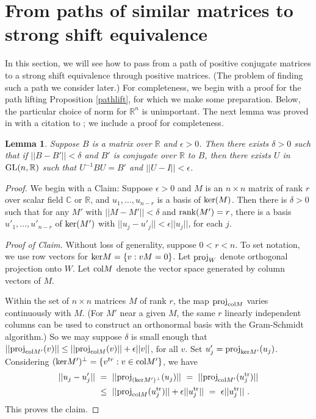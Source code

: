 \documentclass{amsart}
\newtheorem{lemma}[theorem]{Lemma}
\theoremstyle{definition}
\theoremstyle{remark}
\numberwithin{equation}{section}
\begin{document}
{{\section{From paths of similar matrices to strong shift equivalence}
\label{frompathssec}

In this section, we will see how to pass from a path of positive conjugate 
matrices to a strong shift equivalence through positive matrices.   
(The problem of finding such a path we consider later.) 
For completeness, we begin with  a proof for the path lifting 
Proposition \ref{pathlift}, for which we make some preparation. 
Below, the particular choice of norm for $\mathbb R^n$ is 
unimportant. The next lemma was proved in \cite{KR3} with a 
citation to \cite{GR}; we include a proof for completeness. 

\begin{lemma} 
\label{closeconjugation}
Suppose $B$ is a matrix over $\mathbb R$ 
and $\epsilon > 0$. 
Then there exists $\delta >0 $ such that 
if  $||B-B'||<\delta$ and 
$B'$ is conjugate over $\mathbb R$ to $B$, 
then there exists $U$ in $\textnormal{GL}(n,\mathbb R)$ such that 
$U^{-1}BU = B'$ and $||U-I||<\epsilon$. 
\end{lemma} 

\begin{proof} 
We begin with a Claim: 
Suppose $\epsilon > 0$ and $M$ is an $n\times n$ matrix 
of rank $r$ over scalar field $\mathbb C$ or $\mathbb R$, 
and $u_1, \dots , u_{n-r}$ is a basis of $\textnormal{ker}(M)$. 
Then there is $\delta> 0$ such that for any $M'$ with 
$||M-M'||<\delta $ and 
$\textnormal{rank}(M')=r$, there is a basis 
$u'_1, \dots , u'_{n-r}$ of $\textnormal{ker}(M')$ with 
$||u_j-u'_j||<\epsilon ||u_j||$, for each $j$. 

{\it Proof of Claim.} Without loss of generality, suppose 
$0<r<n$. To set notation, we use row vectors
for  $\textnormal{ker}M=\{v:vM=0\}$. 
Let $\textnormal{proj}_W$ denote orthogonal projection onto $W$. Let 
$\textnormal{col} M$ denote the vector space generated by column 
vectors of $M$. 

Within the set of $n\times n$ matrices $M$ of rank $r$, 
the map $\textnormal{proj}_{\textnormal{col}M}$ varies continuously with 
$M$. (For $M'$ near a given $M$, the same $r$ linearly independent 
columns can be used to construct an orthonormal basis with the 
Gram-Schmidt algorithm.) So we may suppose $\delta$ is small enough 
that $||\textnormal{proj}_{\textnormal{col}M'}(v)||
\leq  ||\textnormal{proj}_{\textnormal{col}M}(v)|| + \epsilon ||v||$, for all $v$. 
Set $u'_j= \textnormal{proj}_{\textnormal{ker}M'}(u_j)$. Considering 
$(\textnormal{ker}M')^{\perp}=\{v^{tr}:v\in \textnormal{col}M'\}$, we have 
\begin{align*} 
||u_j-u'_j||\  &  =\  ||\textnormal{proj}_{(\textnormal{ker}M')^{\perp}}(u_j) || \ 
= \ ||\textnormal{proj}_{\textnormal{col}M'}(u^{\textnormal{tr}}_j)|| \\
&  \leq \ 
 ||\textnormal{proj}_{\textnormal{col}M}(u^{\textnormal{tr}}_j)||+ 
\epsilon  ||u^{\textnormal{tr}}_j|| \ 
= \  \epsilon  ||u^{\textnormal{tr}}_j|| \ . 
\end{align*} 
This proves the claim. 


\end{proof}}}
\end{document}
